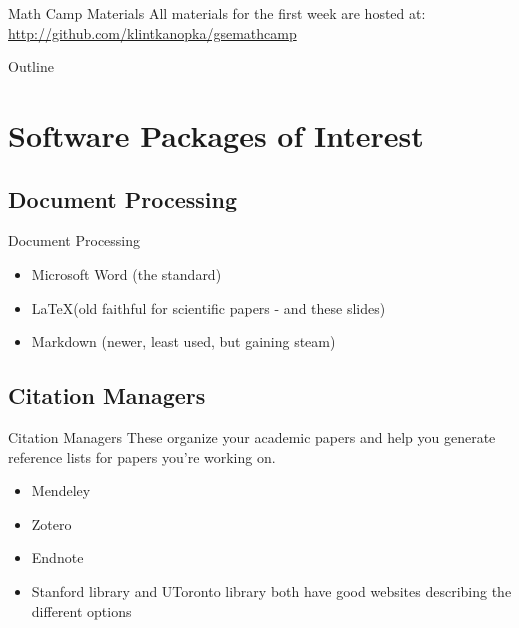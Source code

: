 \documentclass[]{beamer}
\begin{document}
    \begin{frame}{Math Camp Materials}
        All materials for the first week are hosted at:
        \url{http://github.com/klintkanopka/gsemathcamp}
    \end{frame}
    
    \begin{frame}{Outline}
      \tableofcontents
    \end{frame}
    
\section{Software Packages of Interest}

    \subsection{Document Processing}

    \begin{frame}{Document Processing}
        \begin{itemize}
            \item<2-> Microsoft Word (the standard)
            \item<3-> \LaTeX (old faithful for scientific papers - and these slides)
            \item<4-> Markdown (newer, least used, but gaining steam)
        \end{itemize}
    \end{frame}

    \subsection{Citation Managers}

    \begin{frame}{Citation Managers}
        These organize your academic papers and help you generate reference lists for papers you're working on.
        \begin{itemize}
            \item<2-> Mendeley
            \item<3-> Zotero
            \item<4-> Endnote
            \item<5-> Stanford library and UToronto library both have good websites describing the different options
        \end{itemize}
    \end{frame}
\end{document}
